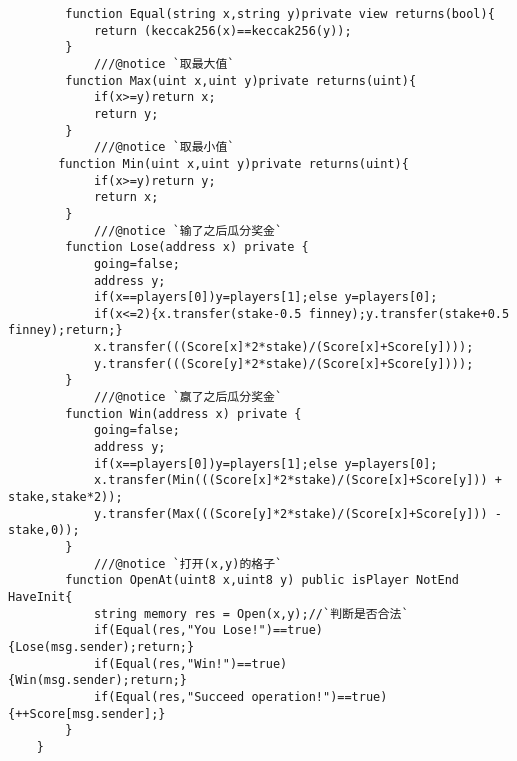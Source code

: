 \documentclass[UTF8]{ctexart}
\begin{document}
\begin{lstlisting}
	    function Equal(string x,string y)private view returns(bool){
	        return (keccak256(x)==keccak256(y));
	    }
			///@notice `取最大值`
	    function Max(uint x,uint y)private returns(uint){
	        if(x>=y)return x;
	        return y;
	    }
			///@notice `取最小值`
	   function Min(uint x,uint y)private returns(uint){
	        if(x>=y)return y;
	        return x;
	    }
			///@notice `输了之后瓜分奖金`
	    function Lose(address x) private {
	        going=false;
	        address y;
	        if(x==players[0])y=players[1];else y=players[0];
	        if(x<=2){x.transfer(stake-0.5 finney);y.transfer(stake+0.5 finney);return;}
	        x.transfer(((Score[x]*2*stake)/(Score[x]+Score[y])));
	        y.transfer(((Score[y]*2*stake)/(Score[x]+Score[y])));
	    }
			///@notice `赢了之后瓜分奖金`
	    function Win(address x) private {
	        going=false;
	        address y;
	        if(x==players[0])y=players[1];else y=players[0];
	        x.transfer(Min(((Score[x]*2*stake)/(Score[x]+Score[y])) + stake,stake*2));
	        y.transfer(Max(((Score[y]*2*stake)/(Score[x]+Score[y])) - stake,0));
	    }
			///@notice `打开(x,y)的格子`
	    function OpenAt(uint8 x,uint8 y) public isPlayer NotEnd HaveInit{
	        string memory res = Open(x,y);//`判断是否合法`
	        if(Equal(res,"You Lose!")==true)  {Lose(msg.sender);return;}
	        if(Equal(res,"Win!")==true)       {Win(msg.sender);return;}
	        if(Equal(res,"Succeed operation!")==true){++Score[msg.sender];}
	    }
	}
	\end{lstlisting}
\end{document}
